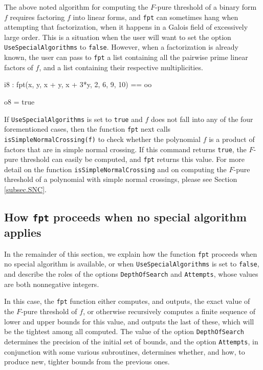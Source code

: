 \documentclass{amsart}
\begin{document}
The above noted algorithm for computing the $F$-pure threshold of a binary form $f$ requires factoring $f$ into linear forms, and {\tt fpt} can sometimes hang when attempting that factorization, when it happens in a Galois field of excessively large order.
This is a situation when the user will want to set the option \texttt{UseSpecialAlgorithms} to \texttt{false}.
However, when a factorization is already known, the user can pass to {\tt fpt} a list containing all the pairwise prime linear factors of $f$, and a list containing their respective multiplicities.

\medspace
{\small
{}
\begin{MyVerbatim}
i8 : fpt({x, y, x + y, x + 3*y}, {2, 6, 9, 10}) == oo

o8 = true
\end{MyVerbatim}
}
\medspace

If {\tt UseSpecialAlgorithms} is set to {\tt true} and $f$ does not fall into any of the four forementioned cases, then the function {\tt fpt} next calls {\tt isSimpleNormalCrossing(f)} to check whether the polynomial $f$ is a product of factors that are in simple normal crossing.  If this command returns {\tt true}, the $F$-pure threshold can easily be computed, and {\tt fpt} returns this value.  For more detail on the function {\tt isSimpleNormalCrossing} and on computing the $F$-pure threshold of a polynomial with simple normal crossings, please see Section \ref{subsec.SNC}.


\subsection{How {\tt fpt} proceeds when no special algorithm applies}

In the remainder of this section, we explain how the function  {\tt fpt} proceeds when no special algorithm is available, or when {\tt UseSpecialAlgorithms} is set to {\tt false}, and describe the roles of the options {\tt DepthOfSearch} and {\tt Attempts}, whose values are both nonnegative integers.

In this case, the {\tt fpt} function either computes, and outputs, the exact value of the $F$-pure threshold of $f$, or otherwise recursively computes a finite sequence of lower and upper bounds for this value, and outputs the last of these, which will be the tightest among all computed.  The value of the option {\tt DepthOfSearch} determines the precision of the initial set of bounds, and the option {\tt Attempts}, in conjunction with some various subroutines, determines whether, and how, to produce new, tighter bounds from the previous ones.
\end{document}

